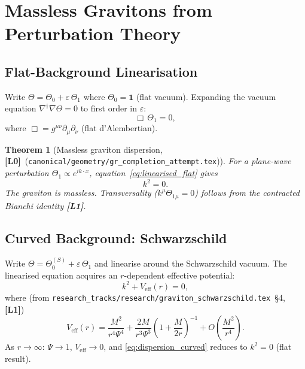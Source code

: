 \documentclass[11pt,a4paper]{article}
\newtheorem{theorem}{Theorem}[section]
\theoremstyle{definition}
\theoremstyle{remark}
\newcommand{\Lzero}{\textbf{[L0]}}
\newcommand{\Lone}{\textbf{[L1]}}
\begin{document}
\section{Massless Gravitons from Perturbation Theory}
\label{sec:gravitons}

\subsection{Flat-Background Linearisation}

Write $\Theta = \Theta_0 + \varepsilon\,\Theta_1$ where
$\Theta_0 = \mathbf{1}$ (flat vacuum).  Expanding the vacuum equation
$\nabla^\dagger\nabla\Theta = 0$ to first order in $\varepsilon$:
\begin{equation}
  \Box\,\Theta_1 = 0,
  \label{eq:linearised_flat}
\end{equation}
where $\Box = g^{\mu\nu}\partial_\mu\partial_\nu$ (flat d'Alembertian).

\begin{theorem}[Massless graviton dispersion, \Lzero\ {\normalfont(}\texttt{canonical/geometry/gr\_completion\_attempt.tex}{\normalfont)}]
\label{thm:graviton}
For a plane-wave perturbation $\Theta_1 \propto e^{ik\cdot x}$,
equation~\eqref{eq:linearised_flat} gives
\begin{equation}
  k^2 = 0.
  \label{eq:graviton_dispersion}
\end{equation}
The graviton is massless.  Transversality ($k^\mu\Theta_{1\mu} = 0$) follows
from the contracted Bianchi identity \Lone.
\end{theorem}

\subsection{Curved Background: Schwarzschild}

Write $\Theta = \Theta_0^{(S)} + \varepsilon\,\Theta_1$ and linearise
around the Schwarzschild vacuum.  The linearised equation acquires
an $r$-dependent effective potential:
\begin{equation}
  k^2 + V_{\text{eff}}(r) = 0,
  \label{eq:dispersion_curved}
\end{equation}
where (from \texttt{research\_tracks/research/graviton\_schwarzschild.tex}~§4, \Lone)
\begin{equation}
  V_{\text{eff}}(r) = \frac{M^2}{r^4\Psi^4}
    + \frac{2M}{r^3\Psi^3}\!\left(1+\frac{M}{2r}\right)^{-1}
    + O\!\left(\frac{M^2}{r^4}\right).
  \label{eq:Veff}
\end{equation}
As $r\to\infty$: $\Psi\to 1$, $V_{\text{eff}}\to 0$, and
\eqref{eq:dispersion_curved} reduces to $k^2 = 0$ (flat result).
\end{document}
